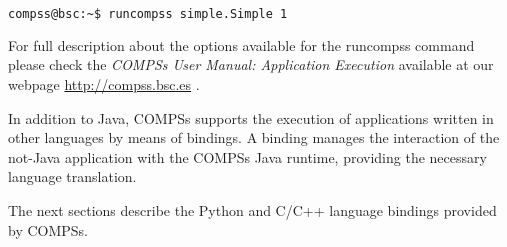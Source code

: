 \begin{lstlisting}[language=bash]
compss@bsc:~$ runcompss simple.Simple 1
\end{lstlisting}

For full description about the options available for the runcompss command please check the \textit{COMPSs User Manual: Application
Execution} available at our webpage \url{http://compss.bsc.es} . 
\newline
~ \newline

In addition to Java, COMPSs supports the execution of applications written in other languages by 
means of bindings. A binding manages the interaction of the not-Java application with the COMPSs 
Java runtime, providing the necessary language translation.

The next sections describe the Python and C/C++ language bindings provided by COMPSs.